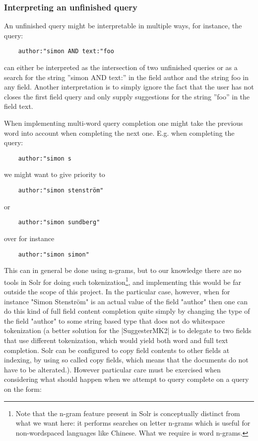 \subsubsection{Interpreting an unfinished query}

An unfinished query might be interpretable in multiple ways, for instance, the query:
\begin{verbatim}
    author:"simon AND text:"foo
\end{verbatim}

can either be interpreted as the intersection of two unfinished queries or as a search for the string ''simon AND text:'' in the field author and the string foo in any field. Another interpretation is to simply ignore the fact that the user has not closes the first field query and only supply suggestions for the string ''foo'' in the field text. 

When implementing multi-word query completion one might take the previous word into account when completing the next one. E.g. when completing the query:
\begin{verbatim}
    author:"simon s
\end{verbatim}

we might want to give priority to
\begin{verbatim}
    author:"simon stenström"
\end{verbatim}
or
\begin{verbatim}
    author:"simon sundberg"
\end{verbatim}
over for instance
\begin{verbatim}
    author:"simon simon"
\end{verbatim}
This can in general be done using n-grams, but to our knowledge there are no tools in Solr for doing such tokenization\footnote{Note that the n-gram feature present in Solr is conceptually distinct from what we want here: it performs searches on letter n-grams which is useful for non-wordspaced languages like Chinese. What we require is word n-grams.}, and implementing this would be far outside the scope of this project. In the particular case, however, when for instance "Simon Stenström" is an actual value of the field "author" then one can do this kind of full field content completion quite simply by changing the type of the field "author" to some string based type that does not do whitespace tokenization (a better solution for the |SuggesterMK2| is to delegate to two fields that use different tokenization, which would yield both word and full text completion. Solr can be configured to copy field contents to other fields at indexing, by using so called copy fields, which means that the documents do not have to be alterated.).
However particular care must be exercised when considering what should happen when we attempt to query complete on a query on the form:

